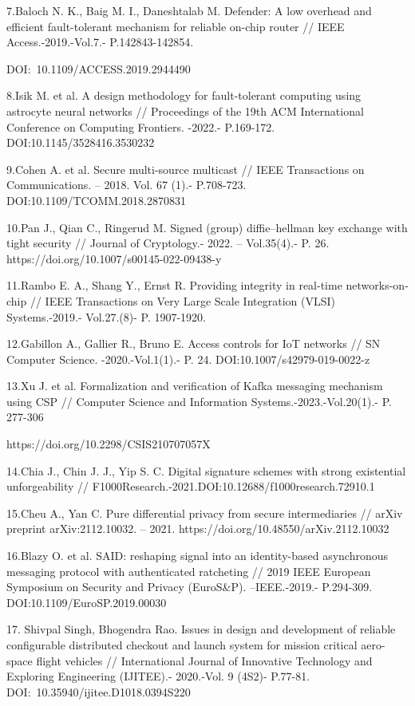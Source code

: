 7.Baloch N. K., Baig M. I., Daneshtalab M. Defender: A low overhead and
efficient fault-tolerant mechanism for reliable on-chip router // IEEE
Access.-2019.-Vol.7.- P.142843-142854.

DOI:~10.1109/ACCESS.2019.2944490

8.Isik M. et al. A design methodology for fault-tolerant computing using
astrocyte neural networks // Proceedings of the 19th ACM International
Conference on Computing Frontiers. -2022.- P.169-172.
DOI:10.1145/3528416.3530232

9.Cohen A. et al. Secure multi-source multicast // IEEE Transactions on
Communications. -- 2018. Vol. 67 (1).- P.708-723.
DOI:10.1109/TCOMM.2018.2870831

10.Pan J., Qian C., Ringerud M. Signed (group) diffie--hellman key
exchange with tight security // Journal of Cryptology.- 2022. --
Vol.35(4).- P. 26. https://doi.org/10.1007/s00145-022-09438-y

11.Rambo E. A., Shang Y., Ernst R. Providing integrity in real-time
networks-on-chip // IEEE Transactions on Very Large Scale Integration
(VLSI) Systems.-2019.- Vol.27.(8)- P. 1907-1920.

12.Gabillon A., Gallier R., Bruno E. Access controls for IoT networks //
SN Computer Science. -2020.-Vol.1(1).- P. 24.
DOI:10.1007/s42979-019-0022-z

13.Xu J. et al. Formalization and verification of Kafka messaging
mechanism using CSP // Computer Science and Information
Systems.-2023.-Vol.20(1).- P. 277-306

https://doi.org/10.2298/CSIS210707057X

14.Chia J., Chin J. J., Yip S. C. Digital signature schemes with strong
existential unforgeability //
F1000Research.-2021.DOI:10.12688/f1000research.72910.1

15.Cheu A., Yan C. Pure differential privacy from secure intermediaries
// arXiv preprint arXiv:2112.10032. -- 2021.
https://doi.org/10.48550/arXiv.2112.10032

16.Blazy O. et al. SAID: reshaping signal into an identity-based
asynchronous messaging protocol with authenticated ratcheting // 2019
IEEE European Symposium on Security and Privacy (EuroS\&P).
--IEEE.-2019.- P.294-309. DOI:10.1109/EuroSP.2019.00030

17. Shivpal Singh, Bhogendra Rao. Issues in design and development of
reliable configurable distributed checkout and launch system for mission
critical aero-space flight vehicles // International Journal of
Innovative Technology and Exploring Engineering (IJITEE).- 2020.-Vol. 9
(4S2)- P.77-81. DOI:~10.35940/ijitee.D1018.0394S220

